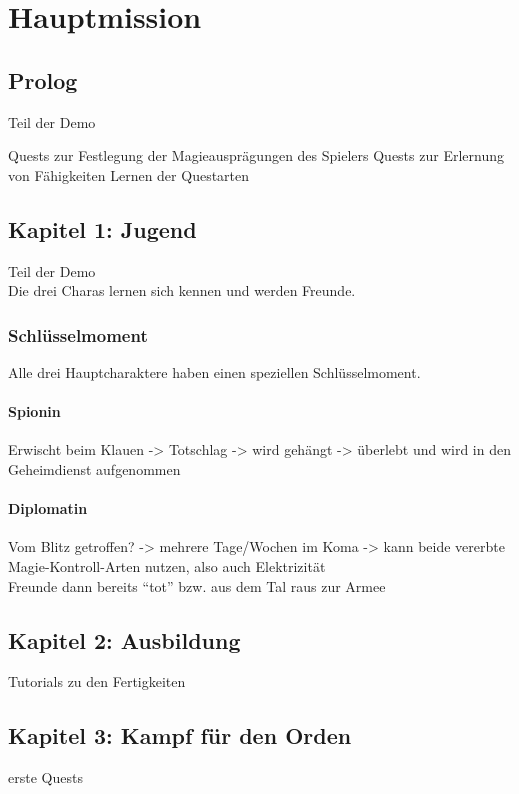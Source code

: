 \chapter{Hauptmission}
\section{Prolog}
Teil der Demo
\begin{outline}
	\1 Quests zur Festlegung der Magieausprägungen des Spielers
	\1 Quests zur Erlernung von Fähigkeiten
	\1 Lernen der Questarten
\end{outline}



\section{Kapitel 1: Jugend}
Teil der Demo \\
Die drei Charas lernen sich kennen und werden Freunde.

\subsection{Schlüsselmoment}
Alle drei Hauptcharaktere haben einen speziellen Schlüsselmoment.

\subsubsection{Spionin}
Erwischt beim Klauen -> Totschlag -> wird gehängt -> überlebt und wird in den Geheimdienst aufgenommen

\subsubsection{Diplomatin}
Vom Blitz getroffen? -> mehrere Tage/Wochen im Koma -> kann beide vererbte Magie-Kontroll-Arten nutzen, also auch Elektrizität \\
Freunde dann bereits "`tot"' bzw. aus dem Tal raus zur Armee



\section{Kapitel 2: Ausbildung}
Tutorials zu den Fertigkeiten




\section{Kapitel 3: Kampf für den Orden}
erste Quests




